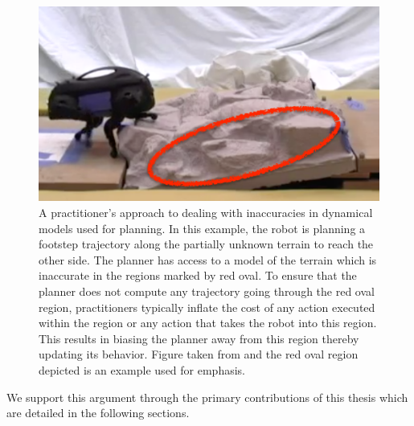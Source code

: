 \begin{figure}[t]
  \centering
  \includegraphics[width=0.5\linewidth]{figures/intro/zucker}
  \caption{A practitioner's approach to dealing with inaccuracies in
    dynamical models used for planning. In this example, the robot is
    planning a footstep trajectory along the partially unknown terrain
  to reach the other side. The planner has access to a model of the
  terrain which is inaccurate in the regions marked by red oval. To
  ensure that the planner does not compute any trajectory going
  through the red oval region, practitioners typically inflate the
  cost of any action executed within the region or any action that
  takes the robot into this region. This results in biasing the
  planner away from this region thereby updating its behavior. Figure
  taken from \cite{DBLP:journals/ijrr/ZuckerRSCBAK11} and the red oval
  region depicted is an example used for emphasis.}
\label{fig:zucker}
\end{figure}


We support this argument through the primary contributions of this thesis which
are detailed in the following sections.

